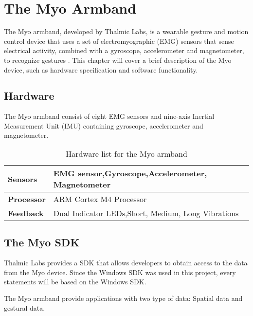 \chapter{The Myo Armband}
\label{chap:myo}
The Myo armband, developed by Thalmic Labs, is a wearable gesture and motion control device that uses a set of electromyographic (EMG) sensors that sense electrical activity, combined with a gyroscope, accelerometer and magnetometer, to recognize gestures \cite{myo}. This chapter will cover a brief description of the Myo device, such as hardware specification and software functionality.

\section{Hardware}
The Myo armband consist of eight EMG sensors and nine-axis Inertial Measurement Unit (IMU) containing gyroscope, accelerometer and magnetometer.

\begin{table}[h!]
\centering
    \begin{tabular}{ | l | p{8cm} |}
        \hline
        \textbf{Sensors} & EMG sensor,\newline Gyroscope,\newline Accelerometer, \newline Magnetometer\\ \hline
        
        \textbf{Processor} & ARM Cortex M4 Processor  \\ \hline
        
        \textbf{Feedback} & Dual Indicator LEDs,\newline Short, Medium, Long Vibrations  \\ \hline
    \end{tabular}
    \caption{Hardware list for the Myo armband}
    \label{table:myo_hardware}
\end{table}

\section{The Myo SDK}
\label{sec:myoSDK}
Thalmic Labs provides a SDK that allows developers to obtain access to the data from the Myo device. Since the Windows SDK was used in this project, every statements will be based on the Windows SDK.

The Myo armband provide applications with two type of data: Spatial data and gestural data.

